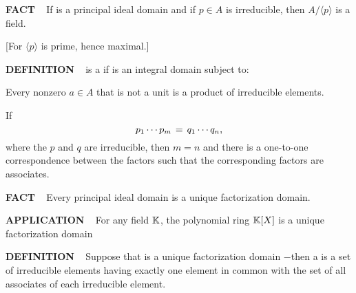 \vspace{0.1cm}


\begin{x}{\small\bf FACT} \ %
If \mA is a principal ideal domain and if $p \in A$ is irreducible, then $A / \langle p \rangle$ is a field.

\vspace{0.1cm}

[For $\langle p \rangle$ is prime, hence maximal.]
\end{x}

\vspace{0.1cm}


\begin{x}{\small\bf DEFINITION} \ %
\mA is a 
if \mA is an integral domain subject to:

\vspace{0.1cm}

\quad Every nonzero $a \in A$ that is not a unit is a product of irreducible elements.

\quad If 
\[
p_1 \cdots p_m \hspace{0.05cm} = \hspace{0.05cm} q_1 \cdots q_n, 
\]
where the $p$ and $q$ are irreducible, then $m = n$ and there is a one-to-one correspondence between the 
factors such that the corresponding factors are associates.

\end{x}

\vspace{0.1cm}


\begin{x}{\small\bf FACT} \ %
Every principal ideal domain is a unique factorization domain.
\end{x}

\vspace{0.1cm}

\begin{x}{\small\bf APPLICATION} \ %
For any field $\mathbb{K}$, the polynomial ring $\mathbb{K}[X]$ is a unique factorization domain
\end{x}

\vspace{0.1cm}


\begin{x}{\small\bf DEFINITION} \ %
Suppose that \mA is a unique factorization domain $-$then a 
is a set of irreducible elements having exactly one element in common with the set of all associates of each irreducible element.
\end{x}

